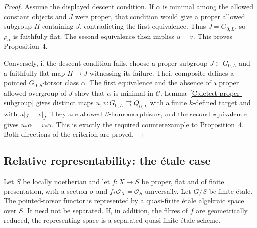 \begin{proof}
Assume the displayed descent condition.  If $\alpha$ is minimal
among the allowed constant objects and $J$ were proper, that
condition would give a proper allowed subgroup $H$ containing $J$,
contradicting the first equivalence.  Thus $J=G_{0,L}$, so
$\rho_\alpha$ is faithfully flat.  The second equivalence then
implies $u=v$.  This proves Proposition~4.

Conversely, if the descent condition fails, choose a proper subgroup
$J\subset G_{0,L}$ and a faithfully flat map $\Pi\to J$ witnessing
its failure.  Their composite defines a pointed $G_{0,S}$-torsor
class $\alpha$.  The first equivalence and the absence of a proper
allowed overgroup of $J$ show that $\alpha$ is minimal in
$\mathcal C$.  Lemma~\ref{C:detect-proper-subgroup} gives distinct
maps $u,v\colon G_{0,L}\rightrightarrows Q_{0,L}$ with a finite
$k$-defined target and with $u|_J=v|_J$.  They are allowed
$S$-homomorphisms, and the second equivalence gives
$u_*\alpha=v_*\alpha$.  This is exactly the required counterexample
to Proposition~4.  Both directions of the criterion are proved.
\end{proof}

\subsection{Relative representability: the \'etale case}

\begin{theorem}
\label{C:etale-moduli}
Let $S$ be locally noetherian and let $f\colon X\to S$ be proper,
flat and of finite presentation, with a section $\sigma$ and
$f_*\mathcal O_X=\mathcal O_S$ universally.  Let $G/S$ be finite
\'etale.  The pointed-torsor functor is represented by a quasi-finite
\'etale algebraic space over $S$.  It need not be separated.
If, in addition, the fibres of $f$ are geometrically reduced, the
representing space is a separated quasi-finite \'etale scheme.
\end{theorem}

